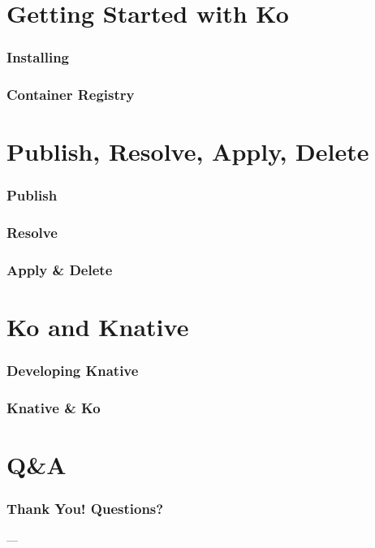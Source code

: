 \documentclass[aspectratio=169,11pt,hyperref={colorlinks=true}]{beamer}
\begin{document}
\section{Getting Started with Ko}

\begin{lgrayrwhiteframe}
  \frametitle{Installing}
\end{lgrayrwhiteframe}

\begin{grayframe}
  \frametitle{Container Registry}
\end{grayframe}

\section{Publish, Resolve, Apply, Delete}

\begin{grayframe}
  \frametitle{Publish}
\end{grayframe}

\begin{grayframe}
  \frametitle{Resolve}
\end{grayframe}

\begin{grayframe}
  \frametitle{Apply \& Delete}
\end{grayframe}

\section{Ko and Knative}

\begin{grayframe}
  \frametitle{Developing Knative}
\end{grayframe}

\begin{grayframe}
  \frametitle{Knative \& Ko}
\end{grayframe}

\section{Q\&A}

\begin{blackframe}
  \frametitle{Thank You! Questions?}
  \vspace{30pt}
  \footnotesize\insertauthor\par---\par%
\end{blackframe}
\end{document}
